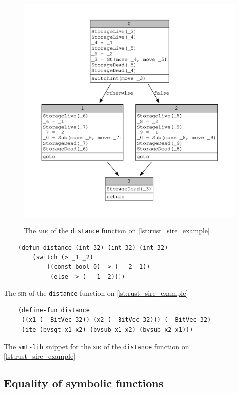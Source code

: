 \begin{figure}[ht]
    \centering
    \includegraphics[height=12cm]{images/distance.pdf}
    \caption{The \textsc{mir} of the \texttt{distance} function on \ref{lst:rust_sire_example}}
  \label{lst:mir_sire_example}
\end{figure}

\begin{listing}[ht]
    \begin{verbatim}
    (defun distance (int 32) (int 32) (int 32) 
        (switch (> _1 _2) 
            ((const bool 0) -> (- _2 _1)) 
             (else -> (- _1 _2))))
    \end{verbatim}
    \caption{The \textsc{sir} of the \texttt{distance} function on \ref{lst:rust_sire_example}}
  \label{lst:sir_sire_example}
\end{listing}

\begin{listing}[ht]
    \begin{verbatim}
    (define-fun distance 
     ((x1 (_ BitVec 32)) (x2 (_ BitVec 32))) (_ BitVec 32) 
     (ite (bvsgt x1 x2) (bvsub x1 x2) (bvsub x2 x1)))
    \end{verbatim}
    \caption{The \texttt{smt-lib} snippet for the \textsc{sir} of the \texttt{distance} function on \ref{lst:rust_sire_example}}
  \label{lst:smt_sire_example}
\end{listing}


\subsection{Equality of symbolic functions}

